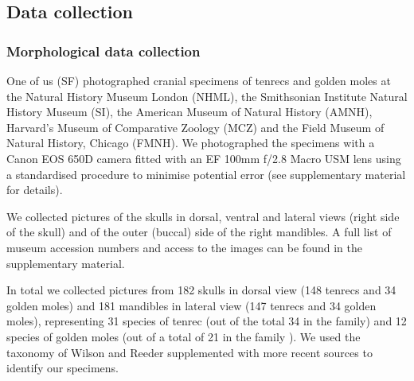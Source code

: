 \documentclass[12pt,a4paper]{article}
\begin{document}
\subsection{Data collection} %

\subsubsection{Morphological data collection} %

	
One of us (SF) photographed cranial specimens of tenrecs and golden moles at the Natural History Museum London (NHML), the Smithsonian Institute Natural History Museum (SI), the American Museum of Natural History (AMNH), Harvard's Museum of Comparative Zoology (MCZ) and the Field Museum of Natural History, Chicago (FMNH). We photographed the specimens with a Canon EOS 650D camera fitted with an EF 100mm f/2.8 Macro USM lens using a standardised procedure to minimise potential error (see supplementary material for details). 



We collected pictures of the skulls in dorsal, ventral and lateral views (right side of the skull) and of the outer (buccal) side of the right mandibles. A full list of museum accession numbers and access to the images can be found in the supplementary material.


In total we collected pictures from 182 skulls in dorsal view (148 tenrecs and 34 golden moles) and 181 mandibles in lateral view (147 tenrecs and 34 golden moles), representing 31 species of tenrec (out of the total 34 in the family) and 12 species of golden moles (out of a total of 21 in the family \citep{Asher2010}). We used the taxonomy of Wilson and Reeder \citeyearpar{Wilson2005} supplemented with more recent sources \citep{IUCN2012, Olson2013} to identify our specimens. 
	
\end{document}
